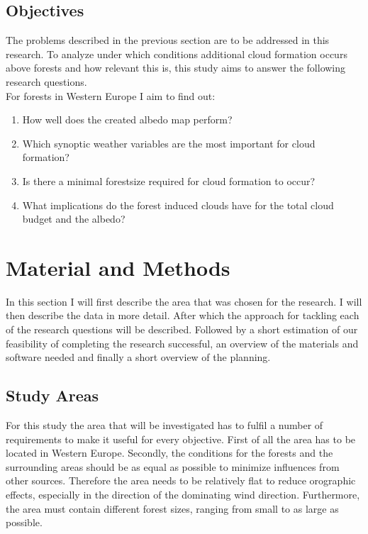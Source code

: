 \documentclass{article}
\begin{document}
\subsection{Objectives}
The problems described in the previous section are to be addressed in this research. To analyze under which conditions additional cloud formation occurs above forests and how relevant this is, this study aims to answer the following research questions. \\

For forests in Western Europe I aim to find out:
\begin{enumerate}
	\item How well does the created albedo map perform?
	\item Which synoptic weather variables are the most important for cloud formation?
	\item Is there a minimal forestsize required for cloud formation to occur?
	\item What implications do the forest induced clouds have for the total cloud budget and the albedo?
\end{enumerate}


\newpage
\section{Material and Methods}  %
In this section I will first describe the area that was chosen for the research. I will then describe the data in more detail. After which the approach for tackling each of the research questions will be described. Followed by a short estimation of our feasibility of completing the research successful, an overview of the materials and software needed and finally a short overview of the planning.

\subsection{Study Areas}
For this study the area that will be investigated has to fulfil a number of requirements to make it useful for every objective. First of all the area has to be located in Western Europe. Secondly, the conditions for the forests and the surrounding areas should be as equal as possible to minimize influences from other sources. Therefore the area needs to be relatively flat to reduce orographic effects, especially in the direction of the dominating wind direction. Furthermore, the area must contain different forest sizes, ranging from small to as large as possible.\\
\end{document}

